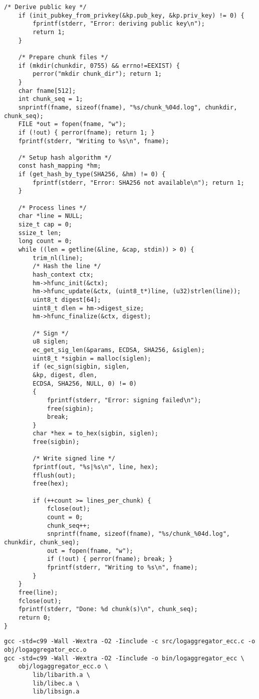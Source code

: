 \begin{lstlisting}[style=cstyle]
	/* Derive public key */
	if (init_pubkey_from_privkey(&kp.pub_key, &kp.priv_key) != 0) {
		fprintf(stderr, "Error: deriving public key\n");
		return 1;
	}
	
	/* Prepare chunk files */
	if (mkdir(chunkdir, 0755) && errno!=EEXIST) {
		perror("mkdir chunk_dir"); return 1;
	}
	char fname[512];
	int chunk_seq = 1;
	snprintf(fname, sizeof(fname), "%s/chunk_%04d.log", chunkdir, chunk_seq);
	FILE *out = fopen(fname, "w");
	if (!out) { perror(fname); return 1; }
	fprintf(stderr, "Writing to %s\n", fname);
	
	/* Setup hash algorithm */
	const hash_mapping *hm;
	if (get_hash_by_type(SHA256, &hm) != 0) {
		fprintf(stderr, "Error: SHA256 not available\n"); return 1;
	}
	
	/* Process lines */
	char *line = NULL;
	size_t cap = 0;
	ssize_t len;
	long count = 0;
	while ((len = getline(&line, &cap, stdin)) > 0) {
		trim_nl(line);
		/* Hash the line */
		hash_context ctx;
		hm->hfunc_init(&ctx);
		hm->hfunc_update(&ctx, (uint8_t*)line, (u32)strlen(line));
		uint8_t digest[64];
		uint8_t dlen = hm->digest_size;
		hm->hfunc_finalize(&ctx, digest);
		
		/* Sign */
		u8 siglen;
		ec_get_sig_len(&params, ECDSA, SHA256, &siglen);
		uint8_t *sigbin = malloc(siglen);
		if (ec_sign(sigbin, siglen,
		&kp, digest, dlen,
		ECDSA, SHA256, NULL, 0) != 0)
		{
			fprintf(stderr, "Error: signing failed\n");
			free(sigbin);
			break;
		}
		char *hex = to_hex(sigbin, siglen);
		free(sigbin);
		
		/* Write signed line */
		fprintf(out, "%s|%s\n", line, hex);
		fflush(out);
		free(hex);
		
		if (++count >= lines_per_chunk) {
			fclose(out);
			count = 0;
			chunk_seq++;
			snprintf(fname, sizeof(fname), "%s/chunk_%04d.log", chunkdir, chunk_seq);
			out = fopen(fname, "w");
			if (!out) { perror(fname); break; }
			fprintf(stderr, "Writing to %s\n", fname);
		}
	}
	free(line);
	fclose(out);
	fprintf(stderr, "Done: %d chunk(s)\n", chunk_seq);
	return 0;
}
\end{lstlisting}
\begin{lstlisting}[numbers=none]
gcc -std=c99 -Wall -Wextra -O2 -Iinclude -c src/logaggregator_ecc.c -o obj/logaggregator_ecc.o
gcc -std=c99 -Wall -Wextra -O2 -Iinclude -o bin/logaggregator_ecc \
	obj/logaggregator_ecc.o \
		lib/libarith.a \
		lib/libec.a \
		lib/libsign.a
\end{lstlisting}
\newpage
